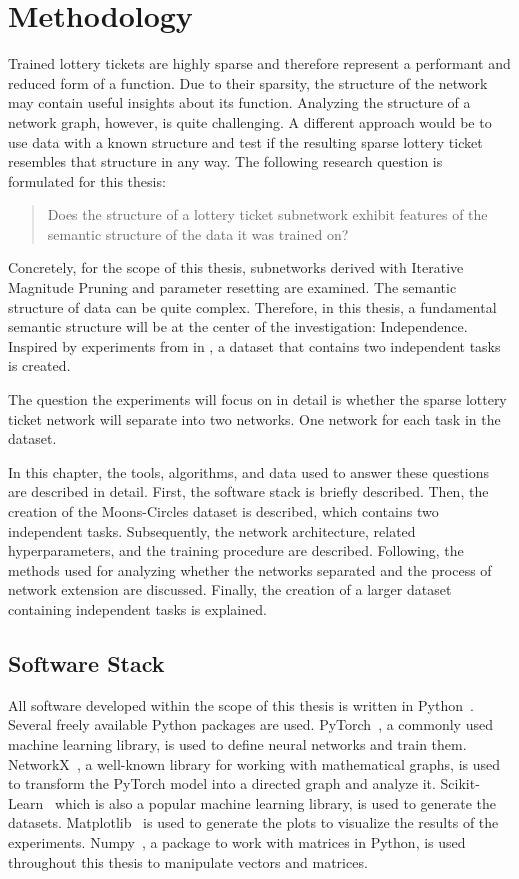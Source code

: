 \chapter{Methodology}
Trained lottery tickets are highly sparse and therefore represent a performant and reduced form of a function.
Due to their sparsity, the structure of the network may contain useful insights about its function.
Analyzing the structure of a network graph, however, is quite challenging.
A different approach would be to use data with a known structure and test if the resulting sparse lottery ticket resembles that structure in any way.
The following research question is formulated for this thesis:

\begin{quote}
   Does the structure of a lottery ticket subnetwork exhibit features of the semantic structure of the data it was trained on?
\end{quote}

Concretely, for the scope of this thesis, subnetworks derived with Iterative Magnitude Pruning and parameter resetting are examined.
The semantic structure of data can be quite complex.
Therefore, in this thesis, a fundamental semantic structure will be at the center of the investigation: Independence.
Inspired by experiments from in \textcite{BIMT}, a dataset that contains two independent tasks is created.

The question the experiments will focus on in detail is whether the sparse lottery ticket network will separate into two networks.
One network for each task in the dataset.

In this chapter, the tools, algorithms, and data used to answer these questions are described in detail.
First, the software stack is briefly described.
Then, the creation of the Moons-Circles dataset is described, which contains two independent tasks.
Subsequently, the network architecture, related hyperparameters, and the training procedure are described.
Following, the methods used for analyzing whether the networks separated and the process of network extension are discussed.
Finally, the creation of a larger dataset containing independent tasks is explained.

\section{Software Stack}
All software developed within the scope of this thesis is written in Python~\autocite{python}.
Several freely available Python packages are used.
PyTorch~\autocite{pytorch}, a commonly used machine learning library, is used to define neural networks and train them.
NetworkX~\autocite{networkx}, a well-known library for working with mathematical graphs, is used to transform the PyTorch model into a directed graph and analyze it.
Scikit-Learn~\autocite{sklearn} which is also a popular machine learning library, is used to generate the datasets.
Matplotlib~\autocite{matplotlib} is used to generate the plots to visualize the results of the experiments.
Numpy~\autocite{numpy}, a package to work with matrices in Python, is used throughout this thesis to manipulate vectors and matrices.

